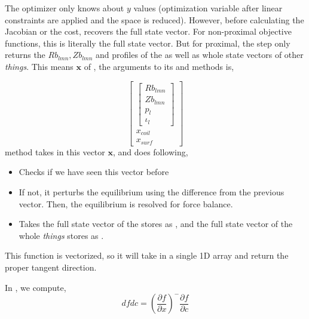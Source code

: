 The optimizer only knows about $y$ values (optimization variable after linear constraints are applied and the space is reduced). However, before calculating the Jacobian or the cost,  recovers the full state vector. For non-proximal objective functions, this is literally the full state vector. But for proximal, the  step only returns the $Rb_{lmn}, Zb_{lmn}$ and profiles of the  as well as whole state vectors of other \textit{things}. This means $\textbf{x}$ of , the arguments to its  and  methods is,

\begin{equation}
    \begin{bmatrix}
        \begin{bmatrix}
        Rb_{lmn} \\ Zb_{lmn} \\ p_l \\ \iota_l
    \end{bmatrix} \\
    x_{coil} \\ x_{surf}
    \end{bmatrix}
\end{equation}
 method takes in this vector $\textbf{x}$, and does following,

\begin{itemize}
    \item Checks if we have seen this vector before
    \item If not, it perturbs the equilibrium using the difference from the previous vector. Then, the equilibrium is resolved for force balance.
    \item Takes the full state vector of the  stores as , and the full state vector of the whole \textit{things} stores as .
\end{itemize}



This function is vectorized, so it will take in a single 1D array and return the proper tangent direction.

In , we compute,
\begin{equation}
    dfdc = \left( \frac{\partial f}{\partial x} \right) ^{-} \frac{\partial f}{\partial c}
\end{equation}

